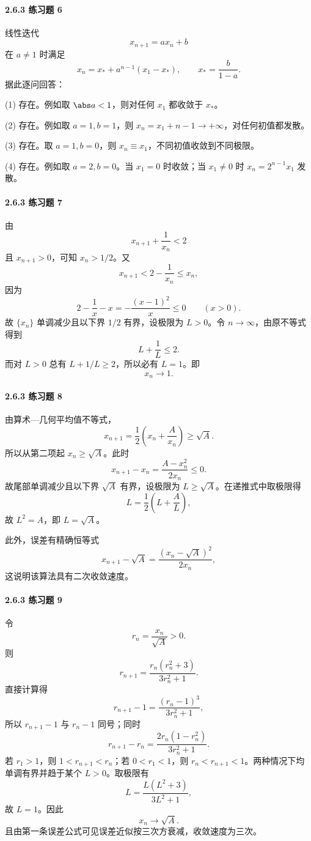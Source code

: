 \paragraph{2.6.3 练习题 6}
\begin{xsolution}
线性迭代
\[
  x_{n+1}=ax_n+b
\]
在 $a\ne1$ 时满足
\[
  x_n=x_*+a^{n-1}(x_1-x_*),
  \qquad x_*=\frac b{1-a}.
\]
据此逐问回答：

(1) 存在。例如取 $\abs a<1$，则对任何 $x_1$ 都收敛于 $x_*$。

(2) 存在。例如取 $a=1,b=1$，则 $x_n=x_1+n-1\to+\infty$，对任何初值都发散。

(3) 存在。取 $a=1,b=0$，则 $x_n\equiv x_1$，不同初值收敛到不同极限。

(4) 存在。例如取 $a=2,b=0$。当 $x_1=0$ 时收敛；当 $x_1\ne0$ 时 $x_n=2^{n-1}x_1$ 发散。
\end{xsolution}

\paragraph{2.6.3 练习题 7}
\begin{xsolution}
由
\[
  x_{n+1}+\frac1{x_n}<2
\]
且 $x_{n+1}>0$，可知 $x_n>1/2$。又
\[
  x_{n+1}<2-\frac1{x_n}\le x_n,
\]
因为
\[
  2-\frac1x-x=-\frac{(x-1)^2}{x}\le0
  \qquad(x>0).
\]
故 $\{x_n\}$ 单调减少且以下界 $1/2$ 有界，设极限为 $L>0$。令 $n\to\infty$，由原不等式得到
\[
  L+\frac1L\le2.
\]
而对 $L>0$ 总有 $L+1/L\ge2$，所以必有 $L=1$。即
\[
  \boxed{x_n\to1}.
\]
\end{xsolution}

\paragraph{2.6.3 练习题 8}
\begin{xsolution}
由算术—几何平均值不等式，
\[
  x_{n+1}=\frac12\left(x_n+\frac A{x_n}\right)\ge\sqrt A.
\]
所以从第二项起 $x_n\ge\sqrt A$。此时
\[
  x_{n+1}-x_n
  =\frac{A-x_n^2}{2x_n}\le0.
\]
故尾部单调减少且以下界 $\sqrt A$ 有界，设极限为 $L\ge\sqrt A$。在递推式中取极限得
\[
  L=\frac12\left(L+\frac A L\right),
\]
故 $L^2=A$，即 $L=\sqrt A$。

此外，误差有精确恒等式
\[
  x_{n+1}-\sqrt A
  =\frac{(x_n-\sqrt A)^2}{2x_n},
\]
这说明该算法具有二次收敛速度。
\end{xsolution}

\paragraph{2.6.3 练习题 9}
\begin{xsolution}
令
\[
  r_n=\frac{x_n}{\sqrt A}>0.
\]
则
\[
  r_{n+1}=\frac{r_n(r_n^2+3)}{3r_n^2+1}.
\]
直接计算得
\[
  r_{n+1}-1=\frac{(r_n-1)^3}{3r_n^2+1},
\]
所以 $r_{n+1}-1$ 与 $r_n-1$ 同号；同时
\[
  r_{n+1}-r_n
  =\frac{2r_n(1-r_n^2)}{3r_n^2+1}.
\]
若 $r_1>1$，则 $1<r_{n+1}<r_n$；若 $0<r_1<1$，则 $r_n<r_{n+1}<1$。两种情况下均单调有界并趋于某个 $L>0$。取极限有
\[
  L=\frac{L(L^2+3)}{3L^2+1},
\]
故 $L=1$。因此
\[
  \boxed{x_n\to\sqrt A}.
\]
且由第一条误差公式可见误差近似按三次方衰减，收敛速度为三次。
\end{xsolution}

